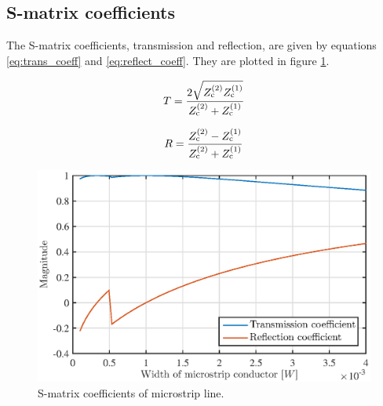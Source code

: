 \subsection{S-matrix coefficients}
The S-matrix coefficients, transmission and reflection, are given by equations \ref{eq:trans_coeff} and \ref{eq:reflect_coeff}.
They are plotted in figure \ref{fig:s-matrix}.

\begin{equation}
T = \frac{2 \sqrt{Z_{\rm c}^{\rm (2)} Z_{\rm c}^{\rm (1)}} } {Z_{\rm c}^{\rm (2)} + Z_{\rm c}^{\rm (1)}}
\label{eq:trans_coeff}
\end{equation}

\begin{equation}
R = \frac{Z_{\rm c}^{\rm (2)} - Z_{\rm c}^{\rm (1)} } {Z_{\rm c}^{\rm (2)} + Z_{\rm c}^{\rm (1)}}
\label{eq:reflect_coeff}
\end{equation}

\begin{figure}[h t b p]
	\centering
	\includegraphics[width=\textwidth,keepaspectratio]{figures/s-matrix_t9.eps}
	\caption{S-matrix coefficients of microstrip line.}
	\label{fig:s-matrix}
\end{figure}